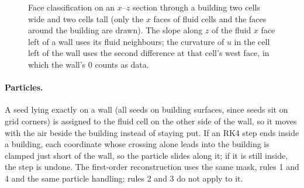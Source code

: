 \documentclass[11pt,a4paper]{article}
\begin{document}
\begin{figure}[ht]
\centering
{}
\caption{Face classification on an $x$--$z$ section through a building two
cells wide and two cells tall (only the $x$ faces of fluid cells and the faces
around the building are drawn). The slope along $z$ of the fluid $x$ face
left of a wall uses its fluid neighbours; the curvature of $u$ in the cell
left of the wall uses the second difference at that cell's west face, in which
the wall's 0 counts as data.}
\label{fig:faces}
\end{figure}

\paragraph{Particles.} A seed lying exactly on a wall (all seeds on building
surfaces, since seeds sit on grid corners) is assigned to the fluid cell on the
other side of the wall, so it moves with the air beside the building instead
of staying put. If an RK4 step ends inside a building, each coordinate whose
crossing alone leads into the building is clamped just short of the wall, so
the particle slides along it; if it is still inside, the step is undone. The
first-order reconstruction uses the same mask, rules 1 and 4 and the same
particle handling; rules 2 and 3 do not apply to it.
\end{document}
